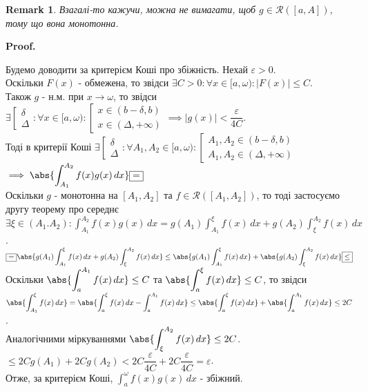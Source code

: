 \documentclass[a4paper, 10pt]{article}
\makeatletter
\def\huge{\displaystyle}
\def\qed{$\blacksquare$}
\theoremstyle{theoremdd}
\theoremstyle{theoremdd}
\theoremstyle{theoremdd}
\theoremstyle{theoremdd}
\theoremstyle{theoremdd}
\theoremstyle{theoremdd}
\theoremstyle{theoremdd}
\newtheorem{remark}[theorem]{Remark}
\theoremstyle{theoremdd}
\theoremstyle{theoremdd}
\renewenvironment{proof}[1][Proof.\\]{\par
\pushQED{\hfill \qed}%
\normalfont \topsep6\p@\@plus6\p@\relax
\trivlist
\item\relax
{\bfseries
#1\@addpunct{.}}\hspace\labelsep\ignorespaces
}{%
\popQED\endtrivlist\@endpefalse
}
\makeatother
\begin{document}
\begin{remark}
Взагалі-то кажучи, можна не вимагати, щоб $g \in \mathcal{R}([a,A])$, тому що вона монотонна.
\end{remark}

\begin{proof}
Будемо доводити за критерієм Коші про збіжність. Нехай $\varepsilon > 0$.\\
Оскільки $F(x)$ - обмежена, то звідси $\exists C > 0: \forall x \in [a,\omega): |F(x)| \leq C$.\\
Також $g$ - н.м. при $x \to \omega$, то звідси $\exists \left[ \begin{gathered} \delta \\ \Delta \end{gathered} \right.: \forall x \in [a,\omega): \left[ \begin{gathered} x \in (b-\delta,b) \\ x \in (\Delta,+\infty) \end{gathered} \right. \implies |g(x)| < \dfrac{\varepsilon}{4C}$.\\
Тоді в критерії Коші $\exists \left[ \begin{gathered} \delta \\ \Delta \end{gathered} \right.: \forall A_1,A_2 \in [a,\omega): \left[ \begin{gathered} A_1,A_2 \in (b-\delta,b) \\ A_1,A_2 \in (\Delta,+\infty) \end{gathered} \right.$\\
$\huge\implies \abs{\int_{A_1}^{A_2} f(x)g(x)\,dx} \boxed{=}$\\
Оскільки $g$ - монотонна на $[A_1,A_2]$ та $f \in \mathcal{R}([A_1,A_2])$, то тоді застосуємо другу теорему про середнє\\
$\exists \xi \in (A_1.A_2): \huge\int_{A_1}^{A_2} f(x)g(x)\,dx = g(A_1) \int_{A_1}^{\xi} f(x)\,dx + g(A_2) \int_{\xi}^{A_2} f(x)\,dx$.\\
$\huge\boxed{=} \abs{g(A_1) \int_{A_1}^{\xi} f(x)\,dx + g(A_2) \int_{\xi}^{A_2} f(x)\,dx} \leq \abs{g(A_1) \int_{A_1}^{\xi} f(x)\,dx} + \abs{g(A_2) \int_{\xi}^{A_2} f(x)\,dx} \boxed{\leq}$\\
Оскільки $\abs{\huge\int_a^{A_1} f(x)\,dx} \leq C$ та $\abs{\huge\int_a^{\xi} f(x)\,dx} \leq C$, то звідси \\ $\huge\abs{\int_{A_1}^{\xi} f(x)\,dx} = \abs{\int_{a}^{\xi} f(x)\,dx - \int_{a}^{A_1}f(x)\,dx} \leq \abs{\int_a^\xi f(x)\,dx} + \abs{\int_a^{A_1} f(x)\,dx} \leq 2C$.\\
Аналогічними міркуваннями $\huge\abs{\int_{\xi}^{A_2} f(x)\,dx} \leq 2C$.\\
$\boxed{\leq} 2C g(A_1) + 2C g(A_2) < 2C \dfrac{\varepsilon}{4C} + 2C \dfrac{\varepsilon}{4C} = \varepsilon$.\\
Отже, за критерієм Коші, $\huge\int_a^\omega f(x)g(x)\,dx$ - збіжний.
\end{proof}
\end{document}
